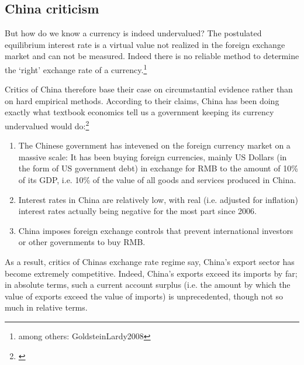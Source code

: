 \documentclass[11pt]{article}
\begin{document}
\subsection{China criticism}

But how do we know a currency is indeed undervalued? The postulated equilibrium interest rate is a virtual value not realized in the foreign exchange market and can not be measured. Indeed there is no reliable method to determine the `right' exchange rate of a currency.\footnote{among others: \cite{pp. 4}{GoldsteinLardy2008}}

Critics of China therefore base their case on circumstantial evidence rather than on hard empirical methods. %
According to their claims, China has been doing exactly what textbook economics tell us a government keeping its currency undervalued would do:\footnote{\cite[pp. 40]{GoldsteinLardy2008}}

\begin{enumerate}
\item{The Chinese government has intevened on the foreign currency market on a massive scale: It has been buying foreign currencies, mainly US Dollars (in the form of US government debt) in exchange for RMB to the amount of 10\% of its GDP, i.e. 10\% of the value of all goods and services produced in China.} %
\item{Interest rates in China are relatively low, with real (i.e. adjusted for inflation) interest rates actually being negative for the most part since 2006.} %
\item{China imposes foreign exchange controls that prevent international investors or other governments to buy RMB.}%
\end{enumerate}

As a result, critics of Chinas exchange rate regime say, China's export sector has become extremely competitive. Indeed, China's exports exceed its imports by far; in absolute terms, such a current account surplus (i.e. the amount by which the value of exports exceed the value of imports) is unprecedented, though not so much in relative terms. %
\end{document}
